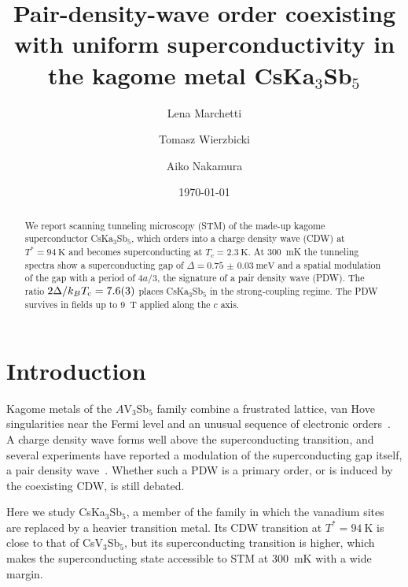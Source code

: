 \documentclass[aps,prl,twocolumn,superscriptaddress,showpacs]{revtex4-2}
\newcommand{\Tc}{T_\mathrm{c}}
\newcommand{\cmpd}{CsKa$_3$Sb$_5$}
\begin{document}
\title{Pair-density-wave order coexisting with uniform superconductivity in the kagome metal \cmpd}

\author{Lena Marchetti}
\author{Tomasz Wierzbicki}
\author{Aiko Nakamura}

\date{\today}

\begin{abstract}
We report scanning tunneling microscopy (STM) of the made-up kagome superconductor \cmpd, which orders into a charge density wave (CDW) at $T^* = \SI{94}{\kelvin}$ and becomes superconducting at $\Tc = \SI{2.3}{\kelvin}$. At \SI{300}{\milli\kelvin} the tunneling spectra show a superconducting gap of $\Delta = \SI{0.75(3)}{\milli\electronvolt}$ and a spatial modulation of the gap with a period of $4a/3$, the signature of a pair density wave (PDW). The ratio $2\Delta/k_B\Tc = \num{7.6 +- 0.3}$ places \cmpd{} in the strong-coupling regime. The PDW survives in fields up to \SI{9}{\tesla} applied along the $c$ axis.
\end{abstract}

\maketitle

\section{Introduction}

Kagome metals of the $A$V$_3$Sb$_5$ family combine a frustrated lattice, van Hove singularities near the Fermi level and an unusual sequence of electronic orders~\cite{Ortiz2020,Jiang2021}. A charge density wave forms well above the superconducting transition, and several experiments have reported a modulation of the superconducting gap itself, a pair density wave~\cite{Chen2021}. Whether such a PDW is a primary order, or is induced by the coexisting CDW, is still debated.

Here we study \cmpd, a member of the family in which the vanadium sites are replaced by a heavier transition metal. Its CDW transition at $T^* = \SI{94}{\kelvin}$ is close to that of CsV$_3$Sb$_5$, but its superconducting transition is higher, which makes the superconducting state accessible to STM at \SI{300}{\milli\kelvin} with a wide margin.
\end{document}
